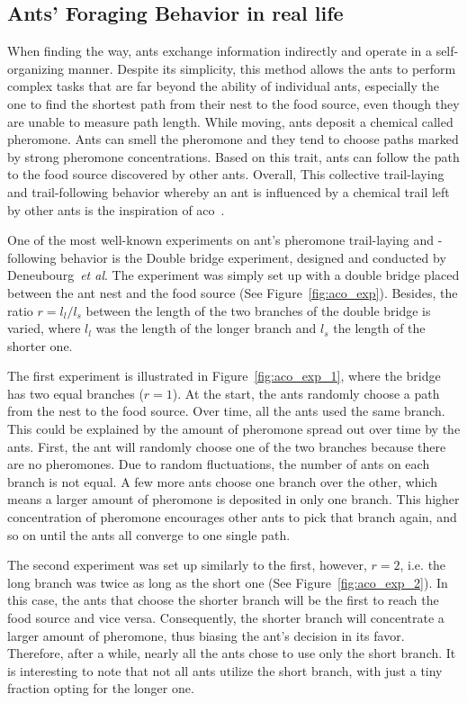 \subsection{Ants’ Foraging Behavior in real life}
When finding the way, ants exchange information indirectly and operate in a self-organizing manner. Despite its simplicity, this method allows the ants to perform complex tasks that are far beyond the ability of individual ants, especially the one to find the shortest path from their nest to the food source, even though they are unable to measure path length. 
While moving, ants deposit a chemical called pheromone. Ants can smell the pheromone and they tend to choose paths marked by strong pheromone concentrations. Based on this trait, ants can follow the path to the food source discovered by other ants. Overall, This collective trail-laying and trail-following behavior whereby an ant is influenced by a chemical trail left by other ants is the inspiration of \gls{aco}~\cite{parsons2005ant}.

One of the most well-known experiments on ant's pheromone trail-laying and -following behavior is the Double bridge experiment, designed and conducted by Deneubourg~\textit{et al}. The experiment was simply set up with a double bridge placed between the ant nest and the food source (See Figure~\ref{fig:aco_exp}). Besides, the ratio $r = l_l / l_s$ between the length of the two branches of the double bridge is varied, where $l_l$ was the length of the longer branch and $l_s$ the length of the shorter one.

The first experiment is illustrated in Figure~\ref{fig:aco_exp_1}, where the bridge has two equal branches ($r = 1$). At the start, the ants randomly choose a path from the nest to the food source. Over time, all the ants used the same branch. This could be explained by the amount of pheromone spread out over time by the ants. First, the ant will randomly choose one of the two branches because there are no pheromones. Due to random fluctuations, the number of ants on each branch is not equal. A few more ants choose one branch over the other, which means a larger amount of pheromone is deposited in only one branch. This higher concentration of pheromone encourages other ants to pick that branch again, and so on until the ants all converge to one single path.

The second experiment was set up similarly to the first, however, $r = 2$, i.e. the long branch was twice as long as the short one (See Figure~\ref{fig:aco_exp_2}). In this case, the ants that choose the shorter branch will be the first to reach the food source and vice versa. Consequently, the shorter branch will concentrate a larger amount of pheromone, thus biasing the ant's decision in its favor. Therefore, after a while, nearly all the ants chose to use only the short branch. It is interesting to note that not all ants utilize the short branch, with just a tiny fraction opting for the longer one.

